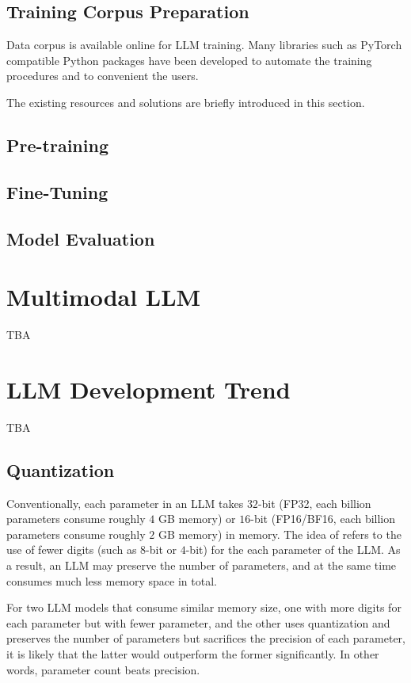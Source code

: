 \subsection{Training Corpus Preparation}

Data corpus is available online for LLM training. Many libraries such as PyTorch compatible Python packages have been developed to automate the training procedures and to convenient the users.

The existing resources and solutions are briefly introduced in this section.

\subsection{Pre-training}

\subsection{Fine-Tuning}

\subsection{Model Evaluation}

\section{Multimodal LLM}

TBA

\section{LLM Development Trend}

TBA

\subsection{Quantization}

Conventionally, each parameter in an LLM takes $32$-bit (FP32, each billion parameters consume roughly $4$ GB memory) or $16$-bit (FP16/BF16, each billion parameters consume roughly $2$ GB memory) in memory. The idea of  refers to the use of fewer digits (such as $8$-bit or $4$-bit) for the each parameter of the LLM. As a result, an LLM may preserve the number of parameters, and at the same time consumes much less memory space in total.

For two LLM models that consume similar memory size, one with more digits for each parameter but with fewer parameter, and the other uses quantization and preserves the number of parameters but sacrifices the precision of each parameter, it is likely that the latter would outperform the former significantly. In other words, parameter count beats precision. 

